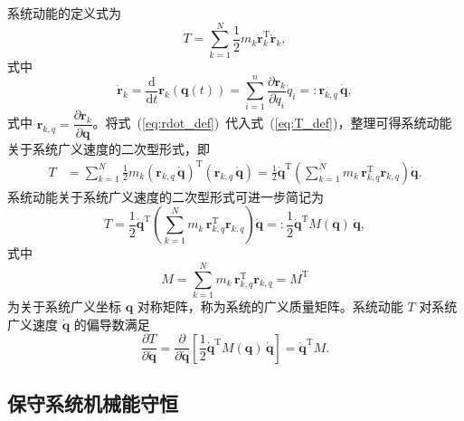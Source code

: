 系统动能的定义式为
\begin{equation}\tag{I}\label{eq:T_def}
T = \sum_{k=1}^{N} \frac{1}{2} m_k \dot{\boldsymbol{r}}_k^{\mathrm{T}} \dot{\boldsymbol{r}}_k,
\end{equation}
式中
\begin{equation}\tag{II}\label{eq:rdot_def}
\dot{\boldsymbol{r}}_k = \frac{\mathrm{d}}{\mathrm{d}t} \boldsymbol{r}_k(\boldsymbol{q}(t)) = \sum_{i=1}^{n} \frac{\partial \boldsymbol{r}_k}{\partial q_i} \dot{q}_i =: \boldsymbol{r}_{k,q}\,\dot{\boldsymbol{q}},
\end{equation}
式中 $\boldsymbol{r}_{k,q} = \dfrac{\partial \boldsymbol{r}_k}{\partial \boldsymbol{q}}$。将式~(\ref{eq:rdot_def})~代入式~(\ref{eq:T_def})，整理可得系统动能关于系统广义速度的二次型形式，即
\begin{equation}\label{eq:2.30}
\begin{aligned}
T &= \sum_{k=1}^{N} \frac{1}{2} m_k (\boldsymbol{r}_{k,q}\,\dot{\boldsymbol{q}})^{\mathrm{T}} (\boldsymbol{r}_{k,q}\,\dot{\boldsymbol{q}}) = \frac{1}{2} \dot{\boldsymbol{q}}^{\mathrm{T}} \!\left(\sum_{k=1}^{N} m_k \,\boldsymbol{r}_{k,q}^{\mathrm{T}} \boldsymbol{r}_{k,q}\right) \!\dot{\boldsymbol{q}}.
\end{aligned}
\end{equation}
系统动能关于系统广义速度的二次型形式可进一步简记为
\begin{equation}\label{eq:2.31}
T = \frac{1}{2} \dot{\boldsymbol{q}}^{\mathrm{T}} \!\left(\sum_{k=1}^{N} m_k \,\boldsymbol{r}_{k,q}^{\mathrm{T}} \boldsymbol{r}_{k,q}\right) \!\dot{\boldsymbol{q}} =: \frac{1}{2} \dot{\boldsymbol{q}}^{\mathrm{T}} M(\boldsymbol{q})\,\dot{\boldsymbol{q}},
\end{equation}
式中
\begin{equation}\label{eq:2.32}
M = \sum_{k=1}^{N} m_k \,\boldsymbol{r}_{k,q}^{\mathrm{T}} \boldsymbol{r}_{k,q} = M^{\mathrm{T}}
\end{equation}
为关于系统广义坐标 $\boldsymbol{q}$ 对称矩阵，称为系统的广义质量矩阵。系统动能 $T$ 对系统广义速度 $\dot{\boldsymbol{q}}$ 的偏导数满足
\begin{equation}\label{eq:2.33}
\frac{\partial T}{\partial \dot{\boldsymbol{q}}} = \frac{\partial}{\partial \dot{\boldsymbol{q}}} \!\left[\frac{1}{2} \dot{\boldsymbol{q}}^{\mathrm{T}} M(\boldsymbol{q})\,\dot{\boldsymbol{q}}\right] = \dot{\boldsymbol{q}}^{\mathrm{T}} M.
\end{equation}

\subsection{保守系统机械能守恒}


